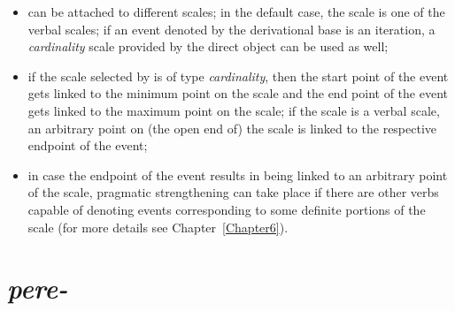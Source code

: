 \begin{itemize}
\item {} can be attached to different scales; in the default case, the scale is one of the verbal scales; if an event denoted by the derivational base is an iteration, a \textit{cardinality} scale provided by the direct object can be used as well;
\item if the scale selected by  is of type \textit{cardinality}, then the start point of the event gets linked to the minimum point on the scale and the end point of the event gets linked to the maximum point on the scale; if the scale is a verbal scale, an arbitrary point on (the open end of) the scale is linked to the respective endpoint of the event;
\item in case the endpoint of the event results in being linked to an arbitrary point of the scale, pragmatic strengthening can take place if there are other verbs capable of denoting events corresponding to some definite portions of the scale (for more details see Chapter~\ref{Chapter6}).
\end{itemize}



\section{\textit{pere-}}\label{subsection:semantics:pere}
